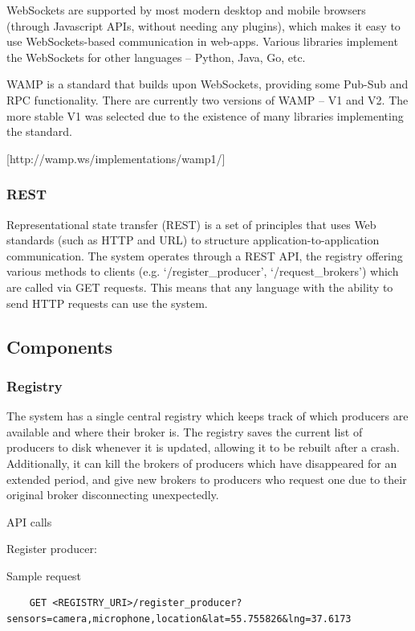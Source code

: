 WebSockets are supported by most modern desktop and mobile browsers
(through Javascript APIs, without needing any plugins), which makes it
easy to use WebSockets-based communication in web-apps. Various
libraries implement the WebSockets for other languages -- Python, Java,
Go, etc.

WAMP is a standard that builds upon WebSockets, providing some Pub-Sub
and RPC functionality. There are currently two versions of WAMP -- V1
and V2. The more stable V1 was selected due to the existence of many
libraries implementing the standard.

{[}http://wamp.ws/implementations/wamp1/{]}

\subsubsection{REST}\label{rest}

Representational state transfer (REST) is a set of principles that uses
Web standards (such as HTTP and URL) to structure
application-to-application communication. The system operates through a
REST API, the registry offering various methods to clients (e.g.
`/register\_producer', `/request\_brokers') which are called via GET
requests. This means that any language with the ability to send HTTP
requests can use the system.

\subsection{Components}\label{components}

\subsubsection{Registry}\label{registry}

The system has a single central registry which keeps track of which
producers are available and where their broker is. The registry saves
the current list of producers to disk whenever it is updated, allowing
it to be rebuilt after a crash. Additionally, it can kill the brokers of
producers which have disappeared for an extended period, and give new
brokers to producers who request one due to their original broker
disconnecting unexpectedly.

API calls

Register producer:

Sample request

\begin{verbatim}
    GET <REGISTRY_URI>/register_producer?sensors=camera,microphone,location&lat=55.755826&lng=37.6173
\end{verbatim}

